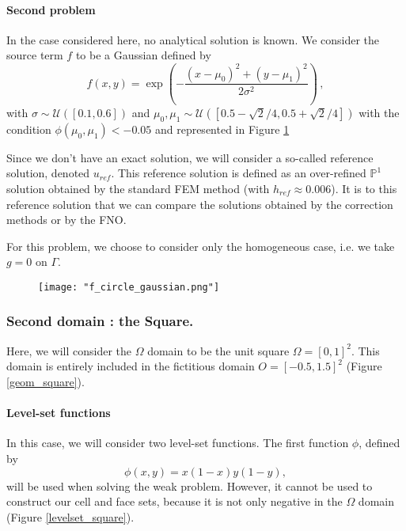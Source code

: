 \paragraph{Second problem} \label{Corr.pb.circle.2}

In the case considered here, no analytical solution is known. We consider the source term $f$ to be a Gaussian defined by
\begin{equation*}
	f(x,y) = \exp\left(-\frac{(x-\mu_0)^2 + (y-\mu_1)^2}{2\sigma^2}\right)\,,
\end{equation*} 
with $\sigma \sim \mathcal{U}([0.1,0.6])$ and $\mu_0, \mu_1 \sim \mathcal{U}([0.5-\sqrt{2}/4, 0.5+\sqrt{2}/4])$ with the condition $\phi(\mu_0, \mu_1) < -0.05$ and represented in Figure \ref{f_circle_gaussian}

Since we don't have an exact solution, we will consider a so-called reference solution, denoted $u_{ref}$. This reference solution is defined as an over-refined $\mathbb{P}^1$ solution obtained by the standard FEM method (with $h_{ref}\approx 0.006$). It is to this reference solution that we can compare the solutions obtained by the correction methods or by the FNO.

\begin{Rem}
	For this problem, we choose to consider only the homogeneous case, i.e. we take $g=0$ on $\Gamma$.
\end{Rem}

\begin{figure}[H]
	\centering
	\texttt{[image: "f\_circle\_gaussian.png"]}
	\label{f_circle_gaussian}
\end{figure} 

\subsubsection{Second domain : the Square.} \label{Corr.pb.square}

Here, we will consider the $\Omega$ domain to be the unit square $\Omega=[0,1]^2$. This domain is entirely included in the fictitious domain $O=[-0.5,1.5]^2$ (Figure \ref{geom_square}).

\paragraph{Level-set functions}

In this case, we will consider two level-set functions. The first function $\phi$, defined by
\begin{equation*}
	\phi(x,y)=x(1-x)y(1-y),
\end{equation*}
will be used when solving the weak problem. However, it cannot be used to construct our cell and face sets, because it is not only negative in the $\Omega$ domain (Figure \ref{levelset_square}).

